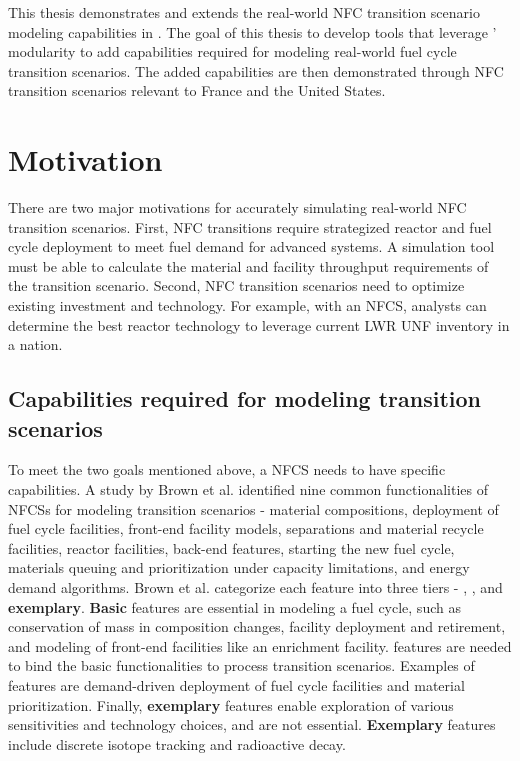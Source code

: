 This thesis demonstrates and extends the real-world \gls{NFC} transition
scenario modeling capabilities in \Cyclus. 
The goal of this thesis to
develop tools that leverage \Cyclus' modularity to
add capabilities required for modeling real-world
fuel cycle transition scenarios. The added capabilities are then
demonstrated through \gls{NFC} transition scenarios relevant to France and the United
States.

\section{Motivation}

There are two major motivations for accurately simulating
real-world \gls{NFC} transition scenarios.
First, \gls{NFC} transitions require strategized reactor
and fuel cycle deployment to meet fuel demand for advanced systems.
A simulation tool must be able to calculate the material
and facility throughput requirements of the transition scenario.
Second, \gls{NFC} transition scenarios need to optimize
existing investment and technology. For example, with an \gls{NFCS},
analysts can determine the best reactor technology
to leverage current \gls{LWR} \gls{UNF} inventory in a nation.


\subsection{Capabilities required for modeling transition scenarios}
To meet the two goals mentioned above, a \gls{NFCS} needs to have
specific capabilities.
A study by Brown et al. \cite{brown_identification_2016}
identified nine common functionalities of \glspl{NFCS} for modeling
transition scenarios - material compositions, deployment of fuel
cycle facilities, front-end facility models, separations and material
recycle facilities, reactor facilities, back-end features, starting
the new fuel cycle, materials queuing and prioritization under
capacity limitations, and energy demand algorithms. Brown et al.
categorize each feature into three tiers - , ,
and \textbf{exemplary}. \textbf{Basic} features are essential in modeling a fuel
cycle, such as conservation of mass in composition changes,
facility deployment and retirement, and modeling of front-end
facilities like an enrichment facility.
 features are
needed to bind the basic functionalities to process
transition scenarios. Examples of  features are
demand-driven deployment of fuel cycle facilities and
material prioritization.
Finally, \textbf{exemplary} features enable exploration
of various sensitivities and technology choices, and are
not essential. \textbf{Exemplary} features include discrete isotope
tracking and radioactive decay.


